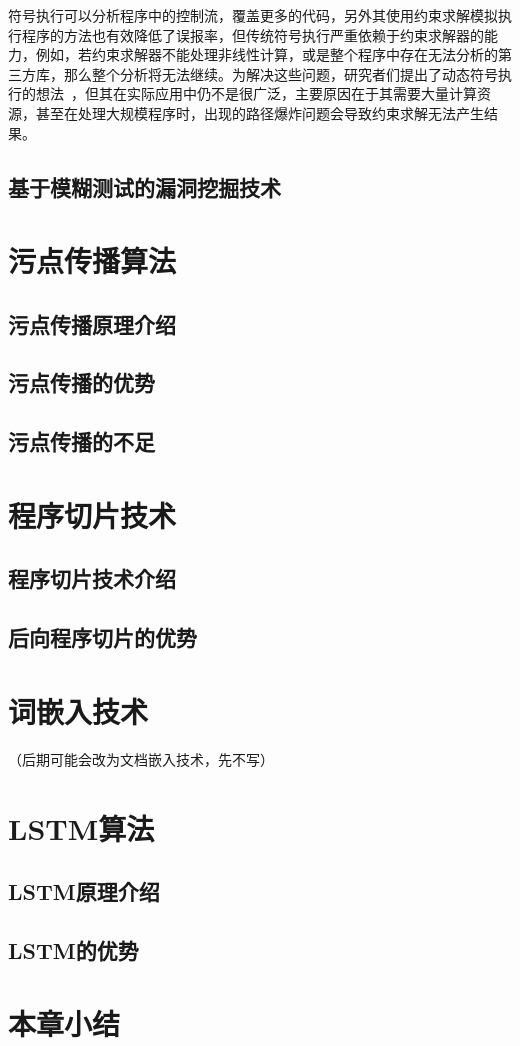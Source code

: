 符号执行可以分析程序中的控制流，覆盖更多的代码，另外其使用约束求解模拟执行程序的方法也有效降低了误报率，但传统符号执行严重依赖于约束求解器的能力，例如，若约束求解器不能处理非线性计算，或是整个程序中存在无法分析的第三方库，那么整个分析将无法继续。为解决这些问题，研究者们提出了动态符号执行的想法~\cite{sym:dart,sym:cute,sym:exe,sym:klee}，但其在实际应用中仍不是很广泛，主要原因在于其需要大量计算资源，甚至在处理大规模程序时，出现的路径爆炸问题会导致约束求解无法产生结果。\\

\subsection{基于模糊测试的漏洞挖掘技术}

\section{污点传播算法}

\subsection{污点传播原理介绍}

\subsection{污点传播的优势}

\subsection{污点传播的不足}

\section{程序切片技术}
\subsection{程序切片技术介绍}

\subsection{后向程序切片的优势}

\section{词嵌入技术}
（后期可能会改为文档嵌入技术，先不写）

\section{LSTM算法}
\subsection{LSTM原理介绍}
\subsection{LSTM的优势}

\section{本章小结}